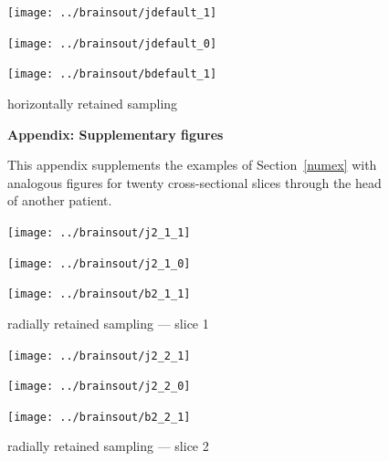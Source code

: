 \documentclass{article}
\begin{document}
\begin{figure}
\begin{centering}

\parbox{.65\textwidth}{\texttt{[image: ../brainsout/jdefault\_1]}}

\vspace{.25in}

\parbox{.65\textwidth}{\texttt{[image: ../brainsout/jdefault\_0]}}

\vspace{.25in}

\parbox{.65\textwidth}{\texttt{[image: ../brainsout/bdefault\_1]}}

\end{centering}
\caption{horizontally retained sampling}
\label{bighorizontal}
\end{figure}



\begin{figure}
{\Large \bf Appendix: Supplementary figures}

\bigskip

This appendix supplements the examples of Section~\ref{numex}
with analogous figures for twenty cross-sectional slices
through the head of another patient.
\end{figure}


\newlength{\vertsep}
\setlength{\vertsep}{.25in}
\newlength{\imsize}
\setlength{\imsize}{.65\textwidth}
\newlength{\vertseps}
\setlength{\vertseps}{.3in}
\newlength{\imsizes}
\setlength{\imsizes}{.46\textwidth}


\begin{figure}
\begin{centering}

\parbox{\imsize}{\texttt{[image: ../brainsout/j2\_1\_1]}}

\vspace{\vertsep}

\parbox{\imsize}{\texttt{[image: ../brainsout/j2\_1\_0]}}

\vspace{\vertsep}

\parbox{\imsize}{\texttt{[image: ../brainsout/b2\_1\_1]}}

\end{centering}
\caption{radially retained sampling --- slice 1}
\end{figure}


\begin{figure}
\begin{centering}

\parbox{\imsize}{\texttt{[image: ../brainsout/j2\_2\_1]}}

\vspace{\vertsep}

\parbox{\imsize}{\texttt{[image: ../brainsout/j2\_2\_0]}}

\vspace{\vertsep}

\parbox{\imsize}{\texttt{[image: ../brainsout/b2\_2\_1]}}

\end{centering}
\caption{radially retained sampling --- slice 2}
\end{figure}
\end{document}
